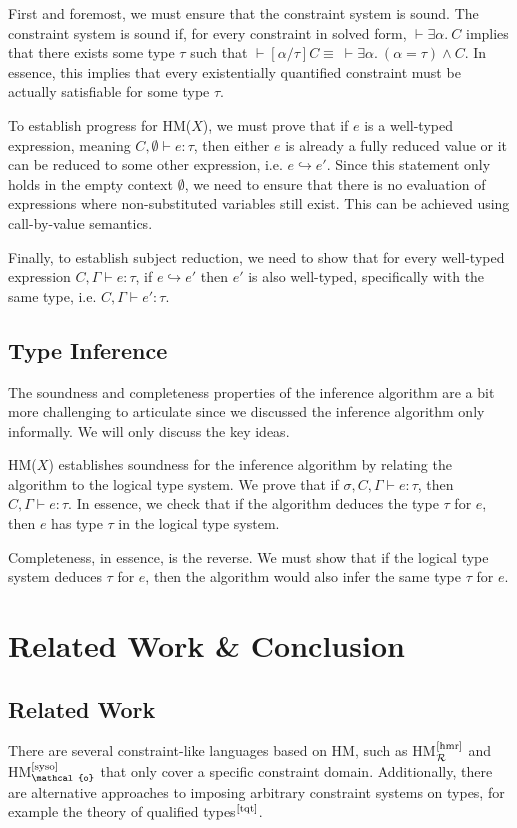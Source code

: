 \documentclass[runningheads]{llncs}
\newcommand{\hmx}{HM($X$)}
\begin{document}
First and foremost, we must ensure that the constraint system is sound. The
constraint system is sound if, for every constraint in solved form, $⊢ ∃α. \ C$
implies that there exists some type $τ$ such that
$⊢ [α/τ]C ≡ \ ⊢ ∃α. \ (α = τ) ∧ C$.
In essence, this implies that every existentially quantified constraint must be
actually satisfiable for some type $τ$.

To establish progress for \hmx{}, we must prove that if $e$ is a
well-typed expression, meaning $C, ∅ ⊢ e : τ$, then either $e$ is already a
fully reduced value or it can be reduced to some other expression,
i.e. $e ↪ e'$. Since this statement only holds in the empty context $∅$, we
need to ensure that there is no evaluation of expressions where non-substituted
variables still exist. This can be achieved using call-by-value semantics.

Finally, to establish subject reduction, we need to show that for every
well-typed expression $C, Γ ⊢ e : τ$, if $e ↪ e'$ then $e'$ is also well-typed,
specifically with the same type, i.e. $C, Γ ⊢ e' : τ$.

\subsection{Type Inference}
The soundness and completeness properties of the inference algorithm are a bit
more challenging to articulate since we discussed the inference algorithm only
informally. We will only discuss the key ideas.

\hmx{} establishes soundness for the inference algorithm by relating the
algorithm to the logical type system. We
prove that if $σ, C, Γ ⊢ e : τ$, then $C, Γ ⊢ e : τ$. In essence, we check
that if the algorithm deduces the type $τ$ for $e$, then $e$ has type $τ$ in
the logical type system.

Completeness, in essence, is the reverse. We must show that if the
logical type system deduces $τ$ for $e$, then the algorithm would also infer
the same type $τ$ for $e$.

\section{Related Work \& Conclusion}
\subsection{Related Work}
There are several constraint-like languages based on HM, such as
HM$_{\mathcal{R}}^\text{\cite{hmr}}$ and HM$_{\mathcal{o}}^\text{\cite{syso}}$
that only cover a
specific constraint domain.
Additionally, there are alternative approaches to imposing arbitrary constraint
systems on types, for example the theory of qualified
types$^\text{\cite{tqt}}$.
\end{document}
